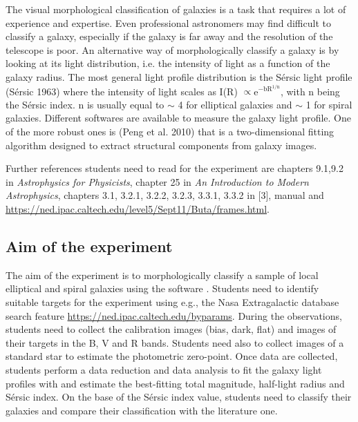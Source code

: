 \documentclass[a4paper, 11pt, fleqn]{memoir}
\begin{document}
The visual morphological classification of galaxies is a task that requires a lot of experience and expertise.
Even professional astronomers may find difficult to classify a galaxy, especially if the galaxy is far away and the resolution of the telescope is poor.
An alternative way of morphologically classify a galaxy is by looking at its light distribution, i.e. the intensity of light as a function of the galaxy radius.
The most general light profile distribution is the S\'ersic light profile (S\'ersic 1963) where the intensity of light scales as I(R)
$\propto$e$^{\mathrm{-b R^{1/n}}}$, with n being the S\'ersic index.
n is usually equal to $\sim$ 4 for elliptical galaxies and $\sim$ 1 for spiral galaxies.
Different softwares are available to measure the galaxy light profile.
One of the more robust ones is  (Peng et al.
2010) that is a two-dimensional fitting algorithm designed to extract
structural components from galaxy images.

Further references students need to read for the experiment are chapters 9.1,9.2 in \emph{Astrophysics for Physicists}\autocite{Choudhuri}, chapter 25 in \emph{An Introduction to Modern Astrophysics}\autocite{carroll2017introduction}, chapters 3.1, 3.2.1, 3.2.2, 3.2.3, 3.3.1, 3.3.2 in [3],  manual and \url{https://ned.ipac.caltech.edu/level5/Sept11/Buta/frames.html}.

\subsection{Aim of the experiment}

The aim of the experiment is to morphologically classify a sample of local elliptical and spiral galaxies using the software .
Students need to identify suitable targets for the experiment using e.g., the Nasa Extragalactic database search feature \url{https://ned.ipac.caltech.edu/byparams}.
During the observations, students need to collect the calibration images (bias, dark, flat) and images of their targets in the B, V and R bands.
Students need also to collect images of a standard star to estimate the photometric zero-point.
Once data are collected, students perform a data reduction and data analysis to fit the galaxy light profiles with  and estimate the best-fitting total magnitude, half-light radius and S\'ersic index.
On the base of the S\'ersic index value, students need to classify their galaxies and compare their classification with the literature one.
\end{document}
